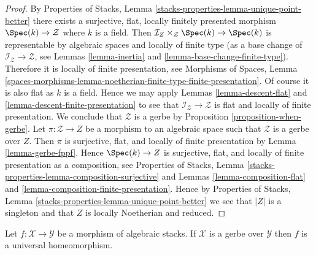 \begin{proof}
By
Properties of Stacks, Lemma \ref{stacks-properties-lemma-unique-point-better}
there exists a surjective, flat, locally finitely presented morphism
$\Spec(k) \to \mathcal{Z}$ where $k$ is a field.
Then $\mathcal{I}_Z \times_\mathcal{Z} \Spec(k) \to \Spec(k)$
is representable by algebraic spaces and
locally of finite type (as a base change of
$\mathcal{I}_\mathcal{Z} \to \mathcal{Z}$, see
Lemmas \ref{lemma-inertia} and \ref{lemma-base-change-finite-type}).
Therefore it is locally of finite presentation, see
Morphisms of Spaces, Lemma
\ref{spaces-morphisms-lemma-noetherian-finite-type-finite-presentation}.
Of course it is also flat as $k$ is a field. Hence we may apply
Lemmas \ref{lemma-descent-flat} and
\ref{lemma-descent-finite-presentation}
to see that $\mathcal{I}_\mathcal{Z} \to \mathcal{Z}$ is flat and
locally of finite presentation. We conclude that $\mathcal{Z}$
is a gerbe by
Proposition \ref{proposition-when-gerbe}.
Let $\pi : \mathcal{Z} \to Z$ be a morphism to an algebraic space such
that $\mathcal{Z}$ is a gerbe over $Z$. Then $\pi$ is surjective, flat, and
locally of finite presentation by
Lemma \ref{lemma-gerbe-fppf}.
Hence $\Spec(k) \to Z$ is surjective, flat, and locally of finite
presentation as a composition, see
Properties of Stacks,
Lemma \ref{stacks-properties-lemma-composition-surjective}
and
Lemmas \ref{lemma-composition-flat} and
\ref{lemma-composition-finite-presentation}.
Hence by
Properties of Stacks, Lemma \ref{stacks-properties-lemma-unique-point-better}
we see that $|Z|$ is a singleton and that $Z$ is locally Noetherian
and reduced.
\end{proof}

\begin{lemma}
\label{lemma-gerbe-bijection-points}
Let $f : \mathcal{X} \to \mathcal{Y}$ be a morphism of algebraic stacks.
If $\mathcal{X}$ is a gerbe over $\mathcal{Y}$ then $f$ is a
universal homeomorphism.
\end{lemma}

